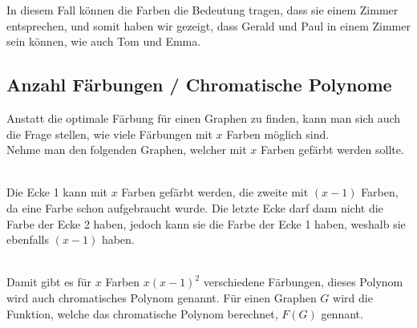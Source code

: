 \documentclass{article}
\begin{document}
\noindent In diesem Fall können die Farben die Bedeutung tragen, dass sie einem Zimmer entsprechen, und somit haben wir gezeigt, dass Gerald und Paul in einem Zimmer sein können, wie auch Tom und Emma.

\subsection{Anzahl Färbungen / Chromatische Polynome}

Anstatt die optimale Färbung für einen Graphen zu finden, kann man sich auch die Frage stellen, wie viele Färbungen mit \(x\) Farben möglich sind. \\

\noindent Nehme man den folgenden Graphen, welcher mit \(x\) Farben gefärbt werden sollte. \\

 \\

\noindent Die Ecke 1 kann mit \(x\) Farben gefärbt werden, die zweite mit \((x-1)\) Farben, da eine Farbe schon aufgebraucht wurde. Die letzte Ecke darf dann nicht die Farbe der Ecke 2 haben, jedoch kann sie die Farbe der Ecke 1 haben, weshalb sie ebenfalls \((x-1)\) haben. \\

 \\

\noindent Damit gibt es für \(x\) Farben \(x(x-1)^2\) verschiedene Färbungen, dieses Polynom wird auch chromatisches Polynom genannt. Für einen Graphen \(G\) wird die Funktion, welche das chromatische Polynom berechnet, \(F(G)\) gennant. \\
\end{document}
